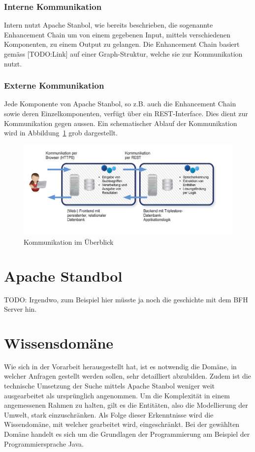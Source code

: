 \subsection{Interne Kommunikation}
\label{sec:architektur_schnittstellen_intern}
Intern nutzt Apache Stanbol, wie bereits beschrieben, die sogenannte Enhancement Chain um von einem gegebenen Input, mittels verschiedenen Komponenten, zu einem Output zu gelangen. Die Enhancement Chain basiert gemäss [TODO:Link] auf einer Graph-Struktur, welche sie zur Kommunikation nutzt.

\subsection{Externe Kommunikation}
\label{sec:architektur_schnittstellen_extern}
Jede Komponente von Apache Stanbol, so z.B. auch die Enhancement Chain sowie deren Einzelkomponenten, verfügt über ein REST-Interface. Dies dient zur Kommunikation gegen aussen. Ein schematischer Ablauf der Kommunikation wird in Abbildung~\ref{fig:kommunikationKomponenten} grob dargestellt.

\begin{figure}[H]
	\centering
	\includegraphics[scale=0.4]{bilder/software_komponenten.png}
	\caption{Kommunikation im Überblick}
\label{fig:kommunikationKomponenten}
\end{figure}


\chapter{Apache Standbol}
\label{chap:ApacheStanbol}
TODO: Irgendwo, zum Beispiel hier müsste ja noch die geschichte mit dem BFH Server hin.

\chapter{Wissensdomäne}
\label{chap:wissensdomäne}
Wie sich in der Vorarbeit herausgestellt hat, ist es notwendig die Domäne, in welcher Anfragen gestellt werden sollen, sehr detailliert abzubilden. Zudem ist die technische Umsetzung der Suche mittels Apache Stanbol weniger weit ausgearbeitet als ursprünglich angenommen. Um die Komplexität in einem angemessenen Rahmen zu halten, gilt es die Entitäten, also die Modellierung der Umwelt, stark einzuschränken. 
Als Folge dieser Erkenntnisse wird die Wissendomäne, mit welcher gearbeitet wird, eingeschränkt. Bei der gewählten Domäne handelt es sich um die Grundlagen der Programmierung am Beispiel der Programmiersprache Java.

